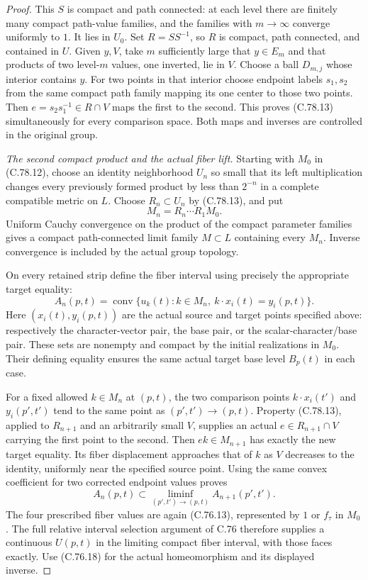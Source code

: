 \begin{proof}
This $S$ is compact and path connected: at each
level there are finitely many compact path-value
families, and the families with $m\to\infty$
converge uniformly to $1$. It lies in $U_0$.
Set $R=SS^{-1}$, so $R$ is compact, path connected,
and contained in $U$. Given $y,V$, take $m$
sufficiently large that $y\in E_m$ and that
products of two level-$m$ values, one inverted,
lie in $V$. Choose a ball $D_{m,j}$ whose
interior contains $y$. For two points in that
interior choose endpoint labels $s_1,s_2$ from
the same compact path family mapping its one
center to those two points. Then
$e=s_2s_1^{-1}\in R\cap V$ maps the first to
the second. This proves (C.78.13) simultaneously
for every comparison space. Both maps and
inverses are controlled in the original group.

\emph{The second compact product and the actual fiber lift.}
Starting with $M_0$ in (C.78.12), choose an
identity neighborhood $U_n$ so small that its
left multiplication changes every previously
formed product by less than $2^{-n}$ in a
complete compatible metric on $L$.
Choose $R_n\subset U_n$ by (C.78.13), and put
\[
                   M_n=R_n\cdots R_1M_0.
                                                               \tag{C.78.14}
\]
Uniform Cauchy convergence on the product of
the compact parameter families gives a compact
path-connected limit family $M\subset L$
containing every $M_n$. Inverse convergence is
included by the actual group topology.

On every retained strip define the fiber interval
using precisely the appropriate target equality:
\[
 A_n(p,t)=\operatorname{conv}
 \{u_k(t):k\in M_n,
          \ k\cdot x_i(t)=y_i(p,t)\}.
                                                               \tag{C.78.15}
\]
Here $(x_i(t),y_i(p,t))$ are the actual source
and target points specified above: respectively
the character-vector pair, the base pair, or
the scalar-character/base pair.
These sets are nonempty and compact by the
initial realizations in $M_0$. Their defining
equality ensures the same actual target base
level $B_p(t)$ in each case.

For a fixed allowed $k\in M_n$ at $(p,t)$,
the two comparison points
$k\cdot x_i(t')$ and $y_i(p',t')$ tend to the
same point as $(p',t')\to(p,t)$.
Property (C.78.13), applied to $R_{n+1}$ and
an arbitrarily small $V$, supplies an actual
$e\in R_{n+1}\cap V$ carrying the first point
to the second. Then $ek\in M_{n+1}$ has exactly
the new target equality. Its fiber displacement
approaches that of $k$ as $V$ decreases to the
identity, uniformly near the specified source
point. Using the same convex coefficient for
two corrected endpoint values proves
\[
                   A_n(p,t)\subset
              \liminf_{(p',t')\to(p,t)}A_{n+1}(p',t').
                                                               \tag{C.78.16}
\]
The four prescribed fiber values are again
(C.76.13), represented by $1$ or $f_\tau$ in
$M_0$. The full relative interval selection
argument of C.76 therefore supplies a continuous
$U(p,t)$ in the limiting compact fiber interval,
with those faces exactly. Use (C.76.18) for the
actual homeomorphism and its displayed inverse.


\end{proof}
